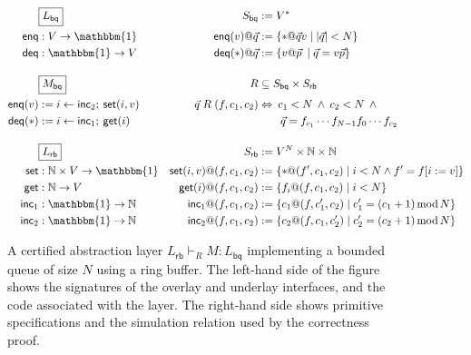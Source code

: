 \documentclass[sigplan,screen]{acmart}
\newcommand{\kw}[1]{\ensuremath{ \mathsf{#1} }}
\begin{document}
\begin{figure*} %
  \begin{minipage}{.9\textwidth}
    \begin{align*}
      & \fbox{$L_\kw{bq}$} &
        S_\kw{bq} &:= V^* \\
      \kw{enq} &: V \rightarrow \mathbbm{1} &
        \kw{enq}(v)@\vec{q} &:= \{ * @ \vec{q} v \mid |\vec{q}| < N \} \\
      \kw{deq} &: \mathbbm{1} \rightarrow V &
        \kw{deq}(*)@\vec{q} &:= \{ v @ \vec{p} \: \mid \vec{q} = v \vec{p} \}
      \\[1em]
      & \fbox{$M_\kw{bq}$} &
        R &\subseteq S_\kw{bq} \times S_\kw{rb} \\
      \kw{enq}(v) &:= i \leftarrow \kw{inc}_2 ; \: \kw{set}(i, v) &
        \vec{q} \mathrel{R} (f, c_1, c_2) &\Leftrightarrow
        \: c_1 < N \:\wedge\: c_2 < N \:\wedge\: {}
      \\
      \kw{deq}(*) &:= i \leftarrow \kw{inc}_1 ; \: \kw{get}(i) &
        & \qquad \vec{q} = f_{c_1} \cdots f_{N-1} f_0 \cdots f_{c_2}
      \\[1em]
      & \fbox{$L_\kw{rb}$} &
        S_\kw{rb} &:= V^N \times \mathbb{N} \times \mathbb{N}
      \\
      \kw{set} &: \mathbb{N} \times V \rightarrow \mathbbm{1} &
        \kw{set}(i, v)@(f, c_1, c_2) &:=
        \{ *@(f', c_1, c_2) \mid i < N \wedge f' = f[i := v] \}
      \\
      \kw{get} &: \mathbb{N} \rightarrow V &
        \kw{get}(i)@(f, c_1, c_2) &:=
        \{ f_i@(f, c_1, c_2) \mid i < N \}
      \\
      \kw{inc}_1 &: \mathbbm{1} \rightarrow \mathbb{N} &
        \kw{inc}_1@(f, c_1, c_2) &:=
        \{ c_1@(f, c_1', c_2) \mid
           c_1' = (c_1 + 1) \mathop{\mathrm{mod}} N \}
      \\
      \kw{inc}_2 &: \mathbbm{1} \rightarrow \mathbb{N} &
        \kw{inc}_2@(f, c_1, c_2) &:=
        \{ c_2@(f, c_1, c_2') \mid
           c_2' = (c_2 + 1) \mathop{\mathrm{mod}} N \}
    \end{align*}
  \end{minipage}
  \caption{A certified abstraction layer
    $L_\kw{rb} \vdash_R M : L_\kw{bq}$
    implementing a bounded queue of size $N$
    using a ring buffer.
    The left-hand side of the figure shows
    the signatures of the overlay and underlay interfaces,
    and the code associated with the layer.
    The right-hand side shows primitive specifications
    and the simulation relation used by the correctness proof.}
  \label{fig:cal}
\end{figure*}
\end{document}
